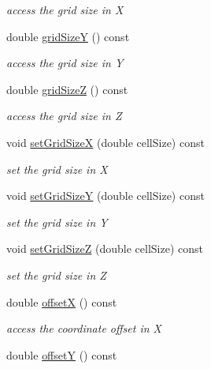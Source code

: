 \begin{DoxyCompactItemize}
\begin{DoxyCompactList}\small\item\em access the grid size in X \end{DoxyCompactList}\item 
double \hyperlink{class_d_d4hep_1_1_geometry_1_1_cartesian_grid_x_y_z_a2ebbc72b0f29394770c8cb953cc615f5}{grid\+SizeY} () const
\begin{DoxyCompactList}\small\item\em access the grid size in Y \end{DoxyCompactList}\item 
double \hyperlink{class_d_d4hep_1_1_geometry_1_1_cartesian_grid_x_y_z_a2eafb3b4ed79a8487ce70f59d7deaac0}{grid\+SizeZ} () const
\begin{DoxyCompactList}\small\item\em access the grid size in Z \end{DoxyCompactList}\item 
void \hyperlink{class_d_d4hep_1_1_geometry_1_1_cartesian_grid_x_y_z_acce211d7c69069d7aaeef3673c0765fb}{set\+Grid\+SizeX} (double cell\+Size) const
\begin{DoxyCompactList}\small\item\em set the grid size in X \end{DoxyCompactList}\item 
void \hyperlink{class_d_d4hep_1_1_geometry_1_1_cartesian_grid_x_y_z_a0cb4f844aec5c850f768b316425f6520}{set\+Grid\+SizeY} (double cell\+Size) const
\begin{DoxyCompactList}\small\item\em set the grid size in Y \end{DoxyCompactList}\item 
void \hyperlink{class_d_d4hep_1_1_geometry_1_1_cartesian_grid_x_y_z_a4f8424dd37aca73fb7d90179869dd3b1}{set\+Grid\+SizeZ} (double cell\+Size) const
\begin{DoxyCompactList}\small\item\em set the grid size in Z \end{DoxyCompactList}\item 
double \hyperlink{class_d_d4hep_1_1_geometry_1_1_cartesian_grid_x_y_z_ad7d540b508988d27504ea67aebc2f3b3}{offsetX} () const
\begin{DoxyCompactList}\small\item\em access the coordinate offset in X \end{DoxyCompactList}\item 
double \hyperlink{class_d_d4hep_1_1_geometry_1_1_cartesian_grid_x_y_z_a9defd49d02b9e56711a3b91d7a4ed665}{offsetY} () const

\end{DoxyCompactItemize}
